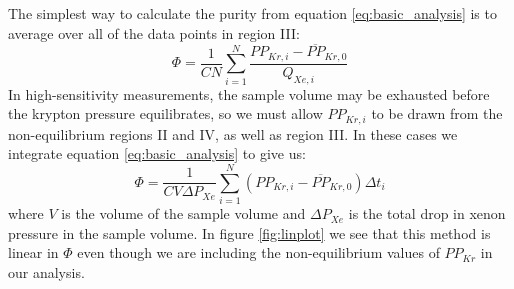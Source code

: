 \documentclass[12pt]{article}
\begin{document}
The simplest way to calculate the purity from equation \ref{eq:basic_analysis} is to average over all of the data points in region III:
\begin{equation}
\Phi=\frac{1}{CN}\sum_{i=1}^{N}\frac{PP_{Kr,i}-\overline{PP}_{Kr,0}}{Q_{Xe,i}}
\label{eq:average_analysis}
\end{equation}
In high-sensitivity measurements, the sample volume may be exhausted before the krypton pressure equilibrates, so we must allow $PP_{Kr,i}$ to be drawn from the non-equilibrium regions II and IV, as well as region III. In these cases we integrate equation \ref{eq:basic_analysis} to give us:
\begin{equation}
\label{eq:int_analysis}
\Phi=\frac{1}{CV\Delta P_{Xe}}\sum_{i=1}^{N} (PP_{Kr,i}-\overline{PP}_{Kr,0})\Delta t_i
\end{equation}
where $V$ is the volume of the sample volume and $\Delta P_{Xe}$ is the total drop in xenon pressure in the sample volume. In figure \ref{fig:linplot} we see that this method is linear in $\Phi$ even though we are including the non-equilibrium values of $PP_{Kr}$ in our analysis.
\end{document}
